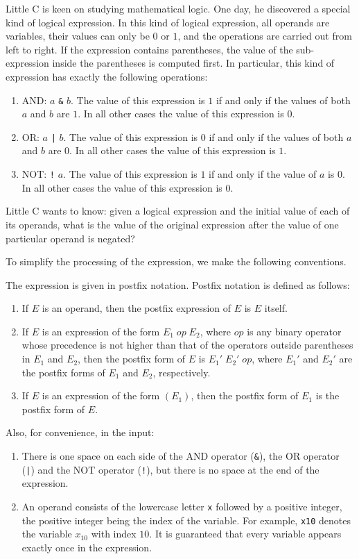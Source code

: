 \documentclass[11pt]{article}
\begin{document}
Little C is keen on studying mathematical logic.
One day, he discovered a special kind of logical expression.
In this kind of logical expression, all operands are variables, their values
can only be $0$ or $1$, and the operations are carried out from left to
right.
If the expression contains parentheses, the value of the sub-expression
inside the parentheses is computed first.
In particular, this kind of expression has exactly the following
operations:
\begin{enumerate}
\item AND: $a$ \texttt{\&} $b$.
  The value of this expression is $1$ if and only if the values of both
  $a$ and $b$ are $1$.
  In all other cases the value of this expression is $0$.
\item OR: $a$ \texttt{|} $b$.
  The value of this expression is $0$ if and only if the values of both
  $a$ and $b$ are $0$.
  In all other cases the value of this expression is $1$.
\item NOT: \texttt{!} $a$.
  The value of this expression is $1$ if and only if the value of $a$ is
  $0$.
  In all other cases the value of this expression is $0$.
\end{enumerate}

Little C wants to know: given a logical expression and the initial value of
each of its operands, what is the value of the original expression after
the value of one particular operand is negated?

To simplify the processing of the expression, we make the following
conventions.

The expression is given in postfix notation.
Postfix notation is defined as follows:
\begin{enumerate}
\item If $E$ is an operand, then the postfix expression of $E$ is $E$
  itself.
\item If $E$ is an expression of the form $E_1 \; op \; E_2$, where $op$
  is any binary operator whose precedence is not higher than that of the
  operators outside parentheses in $E_1$ and $E_2$, then the postfix form
  of $E$ is $E_1' \; E_2' \; op$,
  where $E_1'$ and $E_2'$ are the postfix forms of $E_1$ and $E_2$,
  respectively.
\item If $E$ is an expression of the form $(E_1)$, then the postfix form of
  $E_1$ is the postfix form of $E$.
\end{enumerate}

Also, for convenience, in the input:
\begin{enumerate}
\item[a)] There is one space on each side of the AND operator (\texttt{\&}),
  the OR operator (\texttt{|}) and the NOT operator (\texttt{!}), but
  there is no space at the end of the expression.
\item[b)] An operand consists of the lowercase letter \texttt{x} followed
  by a positive integer, the positive integer being the index of the
  variable.
  For example, \texttt{x10} denotes the variable $x_{10}$ with index $10$.
  It is guaranteed that every variable appears exactly once in the
  expression.
\end{enumerate}
\end{document}
